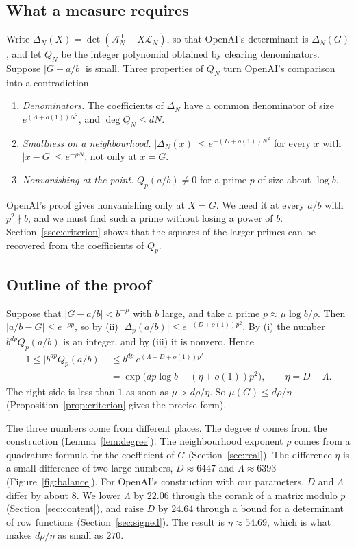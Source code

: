 \documentclass[11pt]{amsart}
\theoremstyle{definition}
\theoremstyle{remark}
\numberwithin{equation}{section}
\newcommand{\cA}{\mathcal A}
\newcommand{\cL}{\mathcal L}
\begin{document}
\subsection{What a measure requires}\label{sec:intro-need}
Write $\Delta_N(X)=\det(\cA^0_N+X\cL_N)$, so that OpenAI's determinant is $\Delta_N(G)$, and let $Q_N$ be
the integer polynomial obtained by clearing denominators. Suppose $|G-a/b|$ is small. Three properties of
$Q_N$ turn OpenAI's comparison into a contradiction.
\begin{enumerate}[label=(\roman*)]
\item \emph{Denominators.} The coefficients of $\Delta_N$ have a common denominator of size
 $e^{(\Lambda+o(1))N^2}$, and $\deg Q_N\le dN$.
\item \emph{Smallness on a neighbourhood.} $|\Delta_N(x)|\le e^{-(D+o(1))N^2}$ for every $x$ with
 $|x-G|\le e^{-\rho N}$, not only at $x=G$.
\item \emph{Nonvanishing at the point.} $Q_p(a/b)\ne0$ for a prime $p$ of size about $\log b$.
\end{enumerate}
OpenAI's proof gives nonvanishing only at $X=G$. We need it at every $a/b$ with $p^2\nmid b$, and we must
find such a prime without losing a power of $b$. Section~\ref{ssec:criterion} shows that the squares of
the larger primes can be recovered from the coefficients of $Q_p$.

\subsection{Outline of the proof}\label{sec:outline}
Suppose that $|G-a/b|<b^{-\mu}$ with $b$ large, and take a prime $p\approx\mu\log b/\rho$. Then
$|a/b-G|\le e^{-\rho p}$, so by (ii) $|\Delta_p(a/b)|\le e^{-(D+o(1))p^2}$. By (i) the number
$b^{dp}Q_p(a/b)$ is an integer, and by (iii) it is nonzero. Hence
\begin{align*}
 1\le\bigl|b^{dp}Q_p(a/b)\bigr|&\le b^{dp}\,e^{(\Lambda-D+o(1))p^2}\\
 &=\exp\bigl(dp\log b-(\eta+o(1))p^2\bigr),\qquad \eta=D-\Lambda .
\end{align*}
The right side is less than $1$ as soon as $\mu>d\rho/\eta$. So $\mu(G)\le d\rho/\eta$
(Proposition~\ref{prop:criterion} gives the precise form).

The three numbers come from different places. The degree $d$ comes from the construction
(Lemma~\ref{lem:degree}). The neighbourhood exponent $\rho$ comes from a quadrature formula for the
coefficient of $G$ (Section~\ref{sec:real}). The difference $\eta$ is a small difference of two large
numbers, $D\approx6447$ and $\Lambda\approx6393$ (Figure~\ref{fig:balance}). For OpenAI's construction with
our parameters, $D$ and $\Lambda$ differ by about $8$. We lower $\Lambda$ by $22.06$ through the corank of
a matrix modulo $p$ (Section~\ref{sec:content}), and raise $D$ by $24.64$ through a bound for a
determinant of row functions (Section~\ref{sec:signed}). The result is $\eta\approx54.69$, which is what
makes $d\rho/\eta$ as small as $270$.
\end{document}
